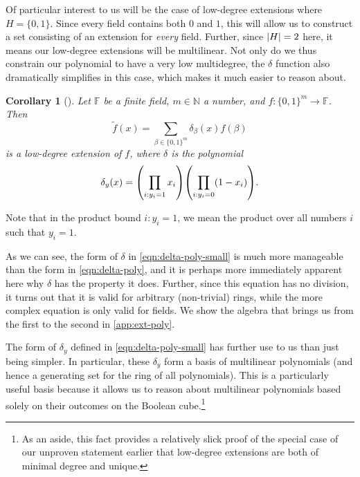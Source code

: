 \documentclass[english,12pt]{reedthesis}
\theoremstyle{plain}
\newtheorem{cor}[cor]{Corollary}
\theoremstyle{definition}
\theoremstyle{remark}
\DeclarePairedDelimiter{\abs}{\lvert}{\rvert}
\begin{document}
Of particular interest to us will be the case of low-degree extensions where
$H = \{0, 1\}$. Since every field contains both $0$ and $1$, this will allow us
to construct a set consisting of an extension for \emph{every} field. Further,
since $\abs{H} = 2$ here, it means our low-degree extensions will be
multilinear. Not only do we thus constrain our polynomial to have a very low
multidegree, the $\delta$ function also dramatically simplifies in this case, which
makes it much easier to reason about.

\begin{cor}[{\cite[]{AW09}}]\label{cor:low-degree-boolean}
  Let $\mathbb{F}$ be a finite field, $m \in \mathbb{N}$ a number, and
  $f\colon \{0, 1\}^{m} \rightarrow \mathbb{F}$. Then
  \begin{equation}\label{eqn:low-deg-ext-small}
    \tilde{f}(x) = \sum_{\beta \in \{0, 1\}^{m}}\delta_{\beta}(x)f(\beta)
  \end{equation}
  is a low-degree extension of $f$, where $\delta$ is the polynomial
  \begin{equation}\label{eqn:delta-poly-small}
    \delta_{y}(x) = \mleft(\prod_{i:y_{i}=1}x_{i}\mright)\mleft(\prod_{i:y_{i}=0}(1 - x_{i})\mright).
  \end{equation}
\end{cor}
Note that in the product bound $i:y_{i} = 1$, we mean the product over all
numbers $i$ such that $y_{i} = 1$.

As we can see, the form of $\delta$ in \cref{eqn:delta-poly-small} is much more
manageable than the form in \cref{eqn:delta-poly}, and it is perhaps more
immediately apparent here why $\delta$ has the property it does. Further, since this
equation has no division, it turns out that it is valid for arbitrary
(non-trivial) rings, while the more complex equation is only valid for fields.
We show the algebra that brings us from the first to the second in
\cref{app:ext-poly}.

The form of $\delta_{y}$ defined in \cref{eqn:delta-poly-small} has further use to us
than just being simpler. In particular, these $\delta_{y}$ form a basis of
multilinear polynomials (and hence a generating set for the ring of all
polynomials). This is a particularly useful basis because it allows us to reason
about multilinear polynomials based solely on their outcomes on the Boolean
cube.\footnote{As an aside, this fact provides a relatively slick proof of the
  special case of our unproven statement earlier that low-degree extensions are
  both of minimal degree and unique.}
\end{document}
